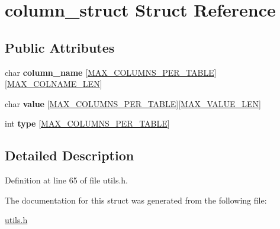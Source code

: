 \hypertarget{structcolumn__struct}{\section{column\-\_\-struct Struct Reference}
\label{structcolumn__struct}
}
\subsection*{Public Attributes}
\begin{DoxyCompactItemize}
\item 
\hypertarget{structcolumn__struct_a746a6c636fc50920dd71c7f32d54b588}{char {\bfseries column\-\_\-name} \mbox{[}\hyperlink{storage_8h_a2c806bc7de304d1d07bb12c9d58dbdd1}{M\-A\-X\-\_\-\-C\-O\-L\-U\-M\-N\-S\-\_\-\-P\-E\-R\-\_\-\-T\-A\-B\-L\-E}\mbox{]}\mbox{[}\hyperlink{storage_8h_a5cced553ee7679aebe25952d79c7b86b}{M\-A\-X\-\_\-\-C\-O\-L\-N\-A\-M\-E\-\_\-\-L\-E\-N}\mbox{]}}\label{structcolumn__struct_a746a6c636fc50920dd71c7f32d54b588}

\item 
\hypertarget{structcolumn__struct_a037b42b6fad865fba3ebb9647d2132da}{char {\bfseries value} \mbox{[}\hyperlink{storage_8h_a2c806bc7de304d1d07bb12c9d58dbdd1}{M\-A\-X\-\_\-\-C\-O\-L\-U\-M\-N\-S\-\_\-\-P\-E\-R\-\_\-\-T\-A\-B\-L\-E}\mbox{]}\mbox{[}\hyperlink{storage_8h_a00a29850f2b5b985f776f864d83e5ac3}{M\-A\-X\-\_\-\-V\-A\-L\-U\-E\-\_\-\-L\-E\-N}\mbox{]}}\label{structcolumn__struct_a037b42b6fad865fba3ebb9647d2132da}

\item 
\hypertarget{structcolumn__struct_a8b6cc106a1f59b8af1f33a14c987f511}{int {\bfseries type} \mbox{[}\hyperlink{storage_8h_a2c806bc7de304d1d07bb12c9d58dbdd1}{M\-A\-X\-\_\-\-C\-O\-L\-U\-M\-N\-S\-\_\-\-P\-E\-R\-\_\-\-T\-A\-B\-L\-E}\mbox{]}}\label{structcolumn__struct_a8b6cc106a1f59b8af1f33a14c987f511}

\end{DoxyCompactItemize}


\subsection{Detailed Description}


Definition at line 65 of file utils.\-h.



The documentation for this struct was generated from the following file\-:\begin{DoxyCompactItemize}
\item 
\hyperlink{utils_8h}{utils.\-h}\end{DoxyCompactItemize}
